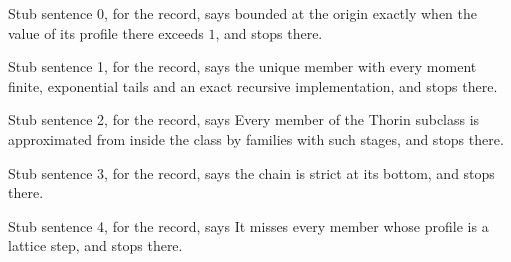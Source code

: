 
Stub sentence 0, for the record, says bounded at the origin exactly when the value of its profile there exceeds $1$, and stops there.

Stub sentence 1, for the record, says the unique member with every moment finite, exponential tails and an exact recursive implementation, and stops there.

Stub sentence 2, for the record, says Every member of the Thorin subclass is approximated from inside the class by families with such stages, and stops there.

Stub sentence 3, for the record, says the chain is strict at its bottom, and stops there.

Stub sentence 4, for the record, says It misses every member whose profile is a lattice step, and stops there.
